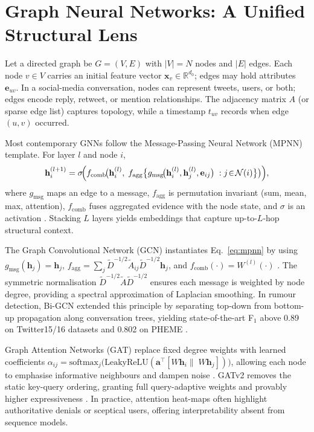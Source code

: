 \documentclass{cshonours}
\begin{document}
\section{Graph Neural Networks: A Unified Structural Lens}


Let a directed graph be \(G=(V,E)\) with \(|V|=N\) nodes and \(|E|\) edges.  Each node \(v\in V\) carries an initial feature vector \(\mathbf{x}_v\in\mathbb{R}^{d_0}\); edges may hold attributes \(\mathbf{e}_{uv}\).  In a social-media conversation, nodes can represent tweets, users, or both; edges encode reply, retweet, or mention relationships.  The adjacency matrix \(A\) (or sparse edge list) captures topology, while a timestamp \(t_{uv}\) records when edge \((u,v)\) occurred.


Most contemporary GNNs follow the Message-Passing Neural Network (MPNN) template.  For layer \(l\) and node \(i\),
\begin{equation}
\mathbf{h}_i^{(l+1)}
=\sigma\!\Bigl(
f_{\text{comb}}\!\bigl(
\mathbf{h}_i^{(l)},\;
f_{\text{agg}}\bigl\{
g_{\text{msg}}\!\bigl(
\mathbf{h}_i^{(l)},\mathbf{h}_j^{(l)},\mathbf{e}_{ij}\bigr)
\; : j\!\in\!\mathcal{N}(i)\bigr\}\bigr)
\Bigr),
\label{eq:mpnn}
\end{equation}
where  
\(g_{\text{msg}}\) maps an edge to a message,  
\(f_{\text{agg}}\) is permutation invariant (sum, mean, max, attention),  
\(f_{\text{comb}}\) fuses aggregated evidence with the node state,  
and \(\sigma\) is an activation \cite{gnn_applications_2024}.  
Stacking \(L\) layers yields embeddings that capture up-to-\(L\)-hop structural context.


The Graph Convolutional Network (GCN) instantiates Eq.~\eqref{eq:mpnn} by using  
\(g_{\text{msg}}(\mathbf{h}_j)=\mathbf{h}_j\),  
\(f_{\text{agg}}=\textstyle\sum\nolimits_{j}\tilde{D}^{-1/2}\tilde{A}_{ij}\tilde{D}^{-1/2}\mathbf{h}_j\),  
and \(f_{\text{comb}}(\cdot)=W^{(l)}(\cdot)\) \cite{kipf2017semi}.  
The symmetric normalisation \(\tilde{D}^{-1/2}\tilde{A}\tilde{D}^{-1/2}\) ensures each message is weighted by node degree, providing a spectral approximation of Laplacian smoothing.  In rumour detection, Bi-GCN extended this principle by separating top-down from bottom-up propagation along conversation trees, yielding state-of-the-art F\(_1\) above 0.89 on Twitter15/16 datasets and 0.802 on PHEME \cite{bian2020rumor}.


Graph Attention Networks (GAT) replace fixed degree weights with learned coefficients  
\(\alpha_{ij}=\text{softmax}_j\bigl(\text{LeakyReLU}(\mathbf{a}^\top[W\mathbf{h}_i\|\;W\mathbf{h}_j])\bigr)\),  
allowing each node to emphasise informative neighbours and dampen noise \cite{velickovic2018gat}.  GATv2 removes the static key-query ordering, granting full query-adaptive weights and provably higher expressiveness \cite{brody2022gatv2}.  In practice, attention heat-maps often highlight authoritative denials or sceptical users, offering interpretability absent from sequence models.
\end{document}
